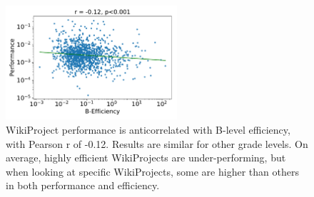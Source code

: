 \documentclass[letterpaper,twocolumn,10pt]{article}
\newcommand{\+}{\phantom{-}}
\begin{document}
\begin{figure}[t!]
\centering
\includegraphics[width=2.5in,height=1.67in]{fig-perf-eff.pdf}
\caption{
WikiProject performance is anticorrelated with B-level efficiency,
with Pearson r of -0.12.
Results are similar for other grade levels.
On average, highly efficient WikiProjects are under-performing,
but when looking at specific WikiProjects,
some are higher than others in both performance and efficiency.
\label{fig:eff-perf}
}
\end{figure}

\end{document}
